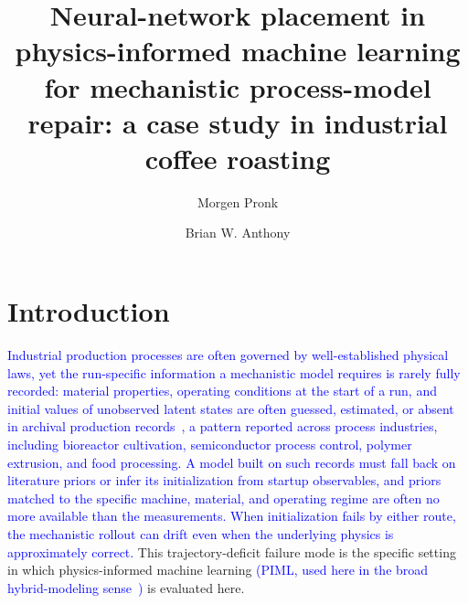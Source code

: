 \documentclass[fleqn,10pt]{wlscirep}
\title{Neural-network placement in physics-informed machine learning for mechanistic process-model repair: a case study in industrial coffee roasting}
\author[1,*]{Morgen Pronk}
\author[1,*]{Brian W. Anthony}
\affil[1]{Massachusetts Institute of Technology, Cambridge, MA, USA}
\affil[*]{morgenpronk@alum.mit.edu; banthony@mit.edu}
\newcommand{\rev}[1]{\textcolor{blue}{#1}}
\begin{document}
\flushbottom
\maketitle
\thispagestyle{empty}

\section*{Introduction}

\rev{Industrial production processes are often governed by well-established physical laws, yet the run-specific information a mechanistic model requires is rarely fully recorded: material properties, operating conditions at the start of a run, and initial values of unobserved latent states are often guessed, estimated, or absent in archival production records~\cite{ljung1999,pillonetto2025}, a pattern reported across process industries, including bioreactor cultivation, semiconductor process control, polymer extrusion, and food processing. A model built on such records must fall back on literature priors or infer its initialization from startup observables, and priors matched to the specific machine, material, and operating regime are often no more available than the measurements. When initialization fails by either route, the mechanistic rollout can drift even when the underlying physics is approximately correct.} This trajectory-deficit failure mode is the specific setting in which physics-informed machine learning \rev{(PIML, used here in the broad hybrid-modeling sense~\cite{karniadakis2021,schweidtmann2024})} is evaluated here.
\end{document}
